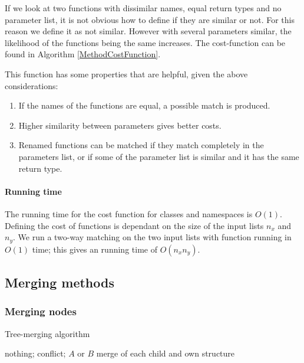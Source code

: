 \documentclass[11pt]{article}
\begin{document}
If we look at two functions with dissimilar names, equal return types and no parameter list, it is not obvious how to define if they are similar or not. For this reason we define it as not similar. However with several parameters similar, the likelihood of the functions being the same increases.  The cost-function can be found in Algorithm \ref{MethodCostFunction}.

This function has some properties that are helpful, given the above considerations:

\begin{enumerate}
\item If the names of the functions are equal, a possible match is produced.
\item Higher similarity between parameters gives better costs.
\item Renamed functions can be matched if they match completely in the parameters list, or if some of the parameter list is similar and it has the same return type.
\end{enumerate}

\paragraph{Running time} The running time for the cost function for classes and namespaces is $O(1)$. Defining the cost of functions is dependant on the size of the input lists $n_x$ and $n_y$. We run a two-way matching on the two input lists with function running in $O(1)$ time; this gives an running time of $O(n_x n_y)$.

\subsection{Merging methods}

\label{MergingFunction}
\subsubsection{Merging nodes}
\begin{algorithm}
\caption{Tree-merging algorithm}
\label{MergeNode}
\begin{algorithmic}
            \State \Return nothing;
        \Else
            \State \Return conflict;
        \EndIf
    \EndIf
        \State \Return $A$ or $B$
    \EndIf
        \State \Return merge of each child and own structure
    \EndIf
        \State \Return {}
    \EndIf
        \State \Return {}
    \EndIf
        \State \Return {}
    \EndIf
\EndFunction
\end{algorithmic}
\end{algorithm}
\end{document}

